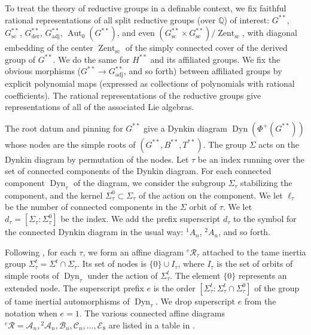 \documentclass[12pt]{amsart}
\newcommand{\op}[1]{\operatorname{#1}}
\newcommand{\ring}[1]{{\mathbb #1}}
\newcommand{\cal}[1]{\mathcal{#1}}
\def\R{\cal{R}}
\theoremstyle{plain}
\theoremstyle{definition}
\begin{document}
To treat the theory of reductive groups in a definable context, we fix
faithful rational representations of all split reductive groups (over
$\ring{Q}$) of interest: $G^{**}$, $G^{**}_{\text{sc}}$, $G^{**}_{\text{der}}$,
$G^{**}_{\text{adj}}$,
$\op{Aut}_0(G^{**})$, and even $(G^{**}_{\text{sc}}\times
G^{**}_{\text{sc}})/\op{Zent}_{\text{sc}}$, with diagonal embedding of the center
$\op{Zent}_{\text{sc}}$ of the simply connected cover of the derived group of
$G^{**}$.  We do the same for $H^{**}$ and its affiliated groups.  We
fix the obvious morphisms ($G^{**}\to G^{**}_{\text{adj}}$, and so forth)
between affiliated groups by explicit polynomial maps (expressed as
collections of polynomials with rational coefficients).  The rational
representations of the reductive groups give
representations of all of the associated Lie algebras.

The root datum and pinning for $G^{**}$ give a Dynkin diagram
$\op{Dyn}(\Phi^+(G^{**}))$ whose nodes are the simple roots of
$(G^{**},B^{**},T^{**})$.  The group $\Sigma$ acts on the Dynkin
diagram by permutation of the nodes.  Let $\tau$ be an index running
over the set of connected components of the Dynkin diagram.  For each
connected component $\op{Dyn}_\tau$ of the diagram, we consider the
subgroup $\Sigma_\tau$ stabilizing the component, and the kernel
$\Sigma^0_\tau\subset \Sigma_\tau$ of the action on the component.  We
let $\ell_\tau$ be the number of connected components in the $\Sigma$
orbit of $\tau$.  We let $d_\tau = [\Sigma_\tau:\Sigma_\tau^0]$ be the
index.  We add the prefix superscript $d_\tau$ to the symbol for the
connected Dynkin diagram in the usual way: ${}^1A_n$, ${}^2A_n$, and
so forth.

Following \cites{reeder2010torsion, Gross}, for each $\tau$, we
form an affine diagram ${}^e\R_\tau$ attached to the tame inertia
group $\Sigma^t_\tau = \Sigma^t\cap \Sigma_\tau$.  Its set of nodes is
$\{0\}\cup I_\tau$, where $I_\tau$ is the set of orbits of simple
roots of $\op{Dyn}_\tau$ under the action of $\Sigma^t_\tau$.  The
element $\{0\}$ represents an extended node.  The superscript prefix
$e$ is the order $[\Sigma^t_\tau:\Sigma^t_\tau\cap \Sigma_\tau^0]$ of
the group of tame inertial automorphisms of $\op{Dyn}_\tau$.  We drop
superscript $e$ from the notation when $e=1$.  The various connected
affine diagrams ${}^e\R = \cal{A}_n, {}^2\cal{A}_n, \cal{B}_n,
\cal{C}_n,\ldots, \cal{E}_8$ are listed in a table in \cite{Gross}.
\end{document}
